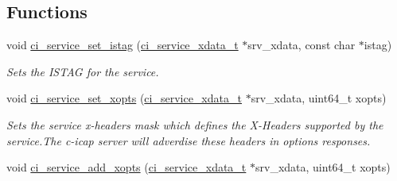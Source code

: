 \subsection*{Functions}
\begin{DoxyCompactItemize}
\item 
void \hyperlink{group__SERVICES_ga63811072507e9b7b78c841f1c9632ee1}{ci\_\-service\_\-set\_\-istag} (\hyperlink{group__SERVICES_ga033e7bb0a88b3619abbc17230ad98eb4}{ci\_\-service\_\-xdata\_\-t} $\ast$srv\_\-xdata, const char $\ast$istag)
\begin{DoxyCompactList}\small\item\em Sets the ISTAG for the service. \item\end{DoxyCompactList}\item 
void \hyperlink{group__SERVICES_ga7da5b123d299b8b91930fe5eb669e254}{ci\_\-service\_\-set\_\-xopts} (\hyperlink{group__SERVICES_ga033e7bb0a88b3619abbc17230ad98eb4}{ci\_\-service\_\-xdata\_\-t} $\ast$srv\_\-xdata, uint64\_\-t xopts)
\begin{DoxyCompactList}\small\item\em Sets the service x-\/headers mask which defines the X-\/Headers supported by the service.The c-\/icap server will adverdise these headers in options responses. \item\end{DoxyCompactList}\item 
\hypertarget{group__SERVICES_ga249f9da52ed2a892da35f5d060435a17}{
void \hyperlink{group__SERVICES_ga249f9da52ed2a892da35f5d060435a17}{ci\_\-service\_\-add\_\-xopts} (\hyperlink{group__SERVICES_ga033e7bb0a88b3619abbc17230ad98eb4}{ci\_\-service\_\-xdata\_\-t} $\ast$srv\_\-xdata, uint64\_\-t xopts)}
\label{group__SERVICES_ga249f9da52ed2a892da35f5d060435a17}


\end{DoxyCompactItemize}
